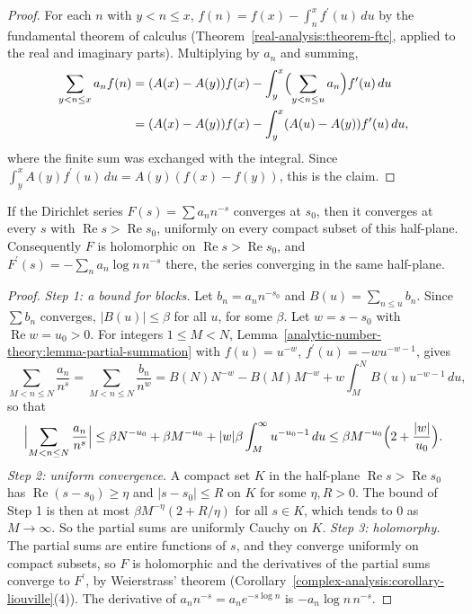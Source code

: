 \begin{proof}
For each $n$ with $y < n \leq x$, $f(n) = f(x) - \int_n^xf^{\prime}(u)\,du$ by the fundamental theorem of calculus (Theorem~\ref{real-analysis:theorem-ftc}, applied to the real and imaginary
parts). Multiplying by $a_n$ and summing,
\[
\begin{aligned}
\sum_{y < n \leq x}a_nf(n) &= (A(x) - A(y))f(x) - \int_y^x\Bigl(\sum_{y < n \leq u}a_n\Bigr)f^{\prime}(u)\,du \\
&= (A(x) - A(y))f(x) - \int_y^x(A(u) - A(y))f^{\prime}(u)\,du,
\end{aligned}
\]
where the finite sum was exchanged with the integral. Since $\int_y^xA(y)f^{\prime}(u)\,du = A(y)(f(x) - f(y))$, this is the claim.
\end{proof}

\begin{theorem}\label{analytic-number-theory:theorem-half-plane}
If the Dirichlet series $F(s) = \sum a_nn^{-s}$ converges at $s_0$, then it converges at every $s$ with $\operatorname{Re}s > \operatorname{Re}s_0$, uniformly on every compact subset of this
half-plane. Consequently $F$ is holomorphic on $\operatorname{Re}s > \operatorname{Re}s_0$, and $F^{\prime}(s) = -\sum_na_n\log n\,n^{-s}$ there, the series converging in the same half-plane.
\end{theorem}

\begin{proof}
\emph{Step 1: a bound for blocks.} Let $b_n = a_nn^{-s_0}$ and $B(u) = \sum_{n \leq u}b_n$. Since $\sum b_n$ converges, $|B(u)| \leq \beta$ for all $u$, for some $\beta$. Let $w = s - s_0$ with
$\operatorname{Re}w = u_0 > 0$. For integers $1 \leq M < N$, Lemma~\ref{analytic-number-theory:lemma-partial-summation} with $f(u) = u^{-w}$, $f^{\prime}(u) = -wu^{-w-1}$, gives
\[
\sum_{M < n \leq N}\frac{a_n}{n^s} = \sum_{M < n \leq N}\frac{b_n}{n^w} = B(N)N^{-w} - B(M)M^{-w} + w\int_M^NB(u)u^{-w-1}\,du,
\]
so that
\[
\Bigl|\sum_{M < n \leq N}\frac{a_n}{n^s}\Bigr| \leq \beta N^{-u_0} + \beta M^{-u_0} + |w|\beta\int_M^\infty u^{-u_0-1}\,du \leq \beta M^{-u_0}\Bigl(2 + \frac{|w|}{u_0}\Bigr).
\]
\emph{Step 2: uniform convergence.} A compact set $K$ in the half-plane $\operatorname{Re}s > \operatorname{Re}s_0$ has $\operatorname{Re}(s - s_0) \geq \eta$ and $|s - s_0| \leq R$ on $K$ for some
$\eta, R > 0$. The bound of Step 1 is then at most $\beta M^{-\eta}(2 + R/\eta)$ for all $s \in K$, which tends to $0$ as $M \to \infty$. So the partial sums are uniformly Cauchy on $K$.
\emph{Step 3: holomorphy.} The partial sums are entire functions of $s$, and they converge uniformly on compact subsets, so $F$ is holomorphic and the derivatives of the partial sums converge to
$F^{\prime}$, by Weierstrass' theorem (Corollary~\ref{complex-analysis:corollary-liouville}(4)). The derivative of $a_nn^{-s} = a_ne^{-s\log n}$ is $-a_n\log n\,n^{-s}$.
\end{proof}

